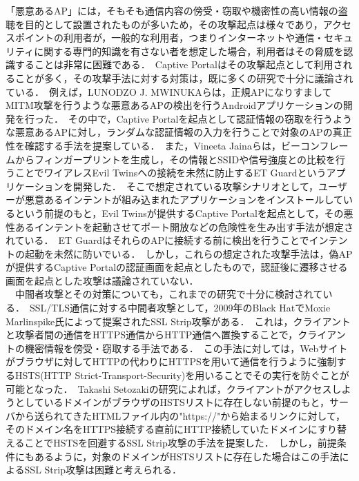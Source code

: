 \documentclass[dvipdfmx,twocolumn,9pt]{jsarticle}
\begin{document}
        「悪意あるAP」には，そもそも通信内容の傍受・窃取や機密性の高い情報の盗聴を目的として設置されたものが多いため，その攻撃起点は様々であり，アクセスポイントの利用者が，一般的な利用者，つまりインターネットや通信・セキュリティに関する専門的知識を有さない者を想定した場合，利用者はその脅威を認識することは非常に困難である．\
        Captive Portalはその攻撃起点として利用されることが多く，その攻撃手法に対する対策は，既に多くの研究で十分に議論されている．\
        例えば，LUNODZO J. MWINUKAらは，正規APになりすましてMITM攻撃を行うような悪意あるAPの検出を行うAndroidアプリケーションの開発を行った\cite{FakeAP}．\
        その中で，Captive Portalを起点として認証情報の窃取を行うような悪意あるAPに対し，ランダムな認証情報の入力を行うことで対象のAPの真正性を確認する手法を提案している．\
        また，Vineeta Jainaらは，ビーコンフレームからフィンガープリントを生成し，その情報とSSIDや信号強度との比較を行うことでワイアレスEvil Twinsへの接続を未然に防止するET Guardというアプリケーションを開発した\cite{ETGuard}．\
        そこで想定されている攻撃シナリオとして，ユーザーが悪意あるインテントが組み込まれたアプリケーションをインストールしているという前提のもと，Evil Twinsが提供するCaptive Portalを起点として，その悪性あるインテントを起動させてポート開放などの危険性を生み出す手法が想定されている．\
        ET GuardはそれらのAPに接続する前に検出を行うことでインテントの起動を未然に防いでいる．\
        しかし，これらの想定された攻撃手法は，偽APが提供するCaptive Portalの認証画面を起点としたもので，認証後に遷移させる画面を起点とした攻撃は議論されていない．\\
        　中間者攻撃とその対策についても，これまでの研究で十分に検討されている．\
        SSL/TLS通信に対する中間者攻撃として，2009年のBlack HatでMoxie Marlinspike氏によって提案されたSSL Strip攻撃がある\cite{SslStrip}．\
        これは，クライアントと攻撃者間の通信をHTTPS通信からHTTP通信へ置換することで，クライアントの機密情報を傍受・窃取する手法である．\
        この手法に対しては，Webサイトがブラウザに対してHTTPの代わりにHTTPSを用いて通信を行うように強制するHSTS(HTTP Strict-Transport-Security)を用いることでその実行を防ぐことが可能となった．\
        Takashi Setozakiの研究\cite{HSTS}によれば，クライアントがアクセスしようとしているドメインがブラウザのHSTSリストに存在しない前提のもと，サーバから送られてきたHTMLファイル内の"https://"から始まるリンクに対して，そのドメイン名をHTTPS接続する直前にHTTP接続していたドメインにすり替えることでHSTSを回避するSSL Strip攻撃の手法を提案した．\
        しかし，前提条件にもあるように，対象のドメインがHSTSリストに存在した場合はこの手法によるSSL Strip攻撃は困難と考えられる．\
\end{document}
